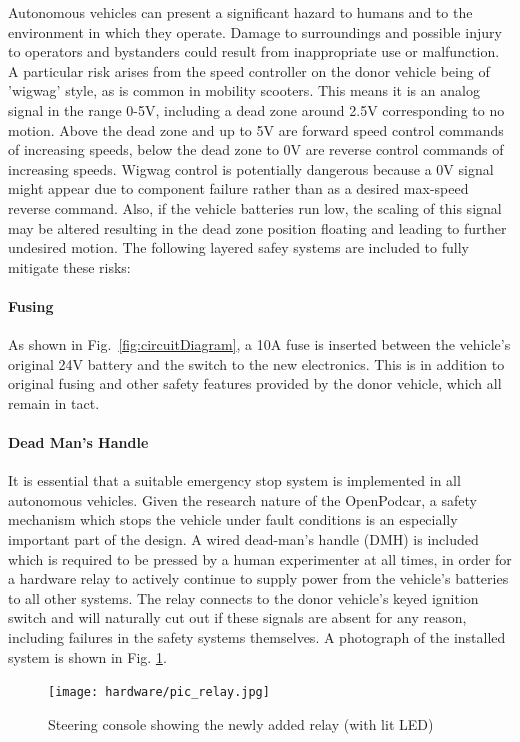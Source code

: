 \documentclass[a4paper]{article}
\begin{document}
	Autonomous vehicles can present a significant hazard to humans and to the environment in which they operate. Damage to surroundings and possible injury to operators and bystanders could result from inappropriate use or malfunction. A particular risk arises from the speed controller on the donor vehicle being of 'wigwag' style, as is common in mobility scooters. This means it is an analog signal in the range 0-5V, including a dead zone around 2.5V corresponding to no motion. Above the dead zone and up to 5V are forward speed control commands of increasing speeds, below the dead zone to 0V are reverse control commands of increasing speeds. Wigwag control is  potentially dangerous because a 0V signal might appear due to component failure rather than as a desired max-speed reverse command. Also, if the vehicle batteries run low, the scaling of this signal may be altered resulting in the dead zone position floating and leading to further undesired motion. The following layered safey systems are included to fully mitigate these risks:
	
	\paragraph{Fusing} As shown in Fig.~\ref{fig:circuitDiagram}, a 10A fuse is inserted between the vehicle's original 24V battery and the switch to the new electronics. This is in addition to original fusing and other safety features provided by the donor vehicle, which all remain in tact. 
	
	\paragraph{Dead Man's Handle} It is essential that a suitable emergency stop system is implemented in all autonomous vehicles. Given the research nature of the OpenPodcar, a safety mechanism which stops the vehicle under fault conditions is an especially important part of the design. A wired dead-man's handle (DMH) is included which is required to be pressed by a human experimenter at all times, in order for a hardware relay to actively continue to supply power from the vehicle’s batteries to all other systems. The relay connects to the donor vehicle's keyed ignition switch and will naturally cut out if these signals are absent for any reason, including failures in the safety systems themselves. A photograph of the installed system is shown in Fig. \ref{fig:relay}.
	
	\begin{figure}
		\centering
		\texttt{[image: hardware/pic\_relay.jpg]}
		\caption{Steering console showing the newly added relay (with lit LED)}
		\label{fig:relay}
	\end{figure}
	
\end{document}
